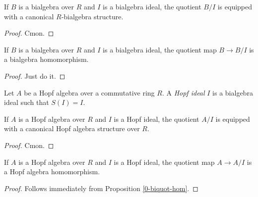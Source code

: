 \begin{proposition}
  \label{0-biquot}

  If $B$ is a bialgebra over $R$ and $I$ is a bialgebra ideal,
  the quotient $B / I$ is equipped with a canonical $R$-bialgebra structure.
\end{proposition}
\begin{proof}

  Cmon.
\end{proof}


\begin{proposition}
  \label{0-biquot-hom}

  If $B$ is a bialgebra over $R$ and $I$ is a bialgebra ideal,
  the quotient map $B \to B / I$ is a bialgebra homomorphism.
\end{proposition}
\begin{proof}

  Just do it.
\end{proof}


\begin{definition}
  \label{0-hopf-ideal}

  Let $A$ be a Hopf algebra over a commutative ring $R$.
  A \emph{Hopf ideal} $I$ is a bialgebra ideal such that $S(I)=I$.
\end{definition}

\begin{proposition}
  \label{0-hopf-quot}

  If $A$ is a Hopf algebra over $R$ and $I$ is a Hopf ideal,
  the quotient $A / I$ is equipped with a canonical Hopf algebra structure over $R$.
\end{proposition}
\begin{proof}

  Cmon.
\end{proof}


\begin{proposition}
  \label{0-hopf-quot-hom}

  If $A$ is a Hopf algebra over $R$ and $I$ is a Hopf ideal,
  the quotient map $A \to A / I$ is a Hopf algebra homomorphism.
\end{proposition}
\begin{proof}

  Follows immediately from Proposition \ref{0-biquot-hom}.
\end{proof}



